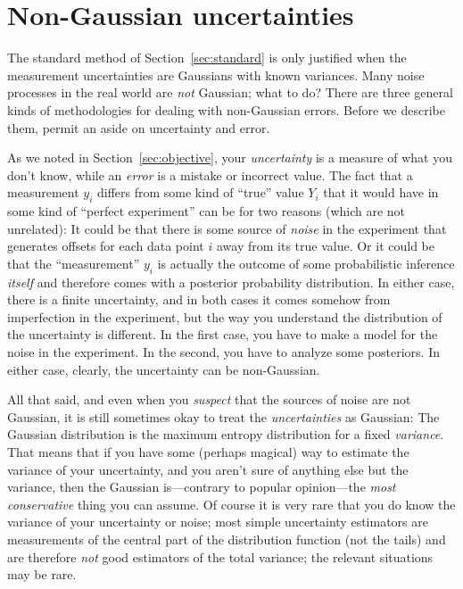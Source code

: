\documentclass[12pt,twoside]{article}
\newcommand{\sectionname}{Section}
\begin{document}
\section{Non-Gaussian uncertainties}\label{sec:non-Gaussian}

The standard method of \sectionname~\ref{sec:standard} is only
justified when the measurement uncertainties are Gaussians with known
variances.  Many noise processes in the real world are \emph{not}
Gaussian; what to do?  There are three general kinds of methodologies
for dealing with non-Gaussian errors.  Before we describe them, permit
an aside on uncertainty and error.

As we noted in \sectionname~\ref{sec:objective}, your
\emph{uncertainty} is a measure of what you don't know, while an
\emph{error} is a mistake or incorrect value.  The fact that a
measurement $y_i$ differs from some kind of ``true'' value $Y_i$ that
it would have in some kind of ``perfect experiment'' can be for two
reasons (which are not unrelated): It could be that there is some
source of \emph{noise} in the experiment that generates offsets for
each data point $i$ away from its true value.  Or it could be that the
``measurement'' $y_i$ is actually the outcome of some probabilistic
inference \emph{itself} and therefore comes with a posterior
probability distribution.  In either case, there is a finite
uncertainty, and in both cases it comes somehow from imperfection in
the experiment, but the way you understand the distribution of the
uncertainty is different.  In the first case, you have to make a model
for the noise in the experiment.  In the second, you have to analyze
some posteriors.  In either case, clearly, the uncertainty can be
non-Gaussian.

All that said, and even when you \emph{suspect} that the sources of
noise are not Gaussian, it is still sometimes okay to treat the
\emph{uncertainties} as Gaussian: The Gaussian distribution is the
maximum entropy distribution for a fixed \emph{variance}.  That means
that if you have some (perhaps magical) way to estimate the variance
of your uncertainty, and you aren't sure of anything else but the
variance, then the Gaussian is---contrary to popular opinion---the
\emph{most conservative} thing you can assume.  Of course it is very
rare that you do know the variance of your uncertainty or noise; most
simple uncertainty estimators are measurements of the central part of
the distribution function (not the tails) and are therefore \emph{not}
good estimators of the total variance; the relevant situations may be
rare.
\end{document}
